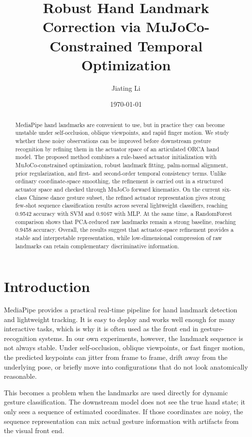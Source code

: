 \documentclass[11pt]{article}
\title{Robust Hand Landmark Correction via MuJoCo-Constrained Temporal Optimization}
\author{Jiating Li}
\date{\today}
\begin{document}
\maketitle

\begin{abstract}
MediaPipe hand landmarks are convenient to use, but in practice they can become unstable under self-occlusion, oblique viewpoints, and rapid finger motion. We study whether these noisy observations can be improved before downstream gesture recognition by refining them in the actuator space of an articulated ORCA hand model. The proposed method combines a rule-based actuator initialization with MuJoCo-constrained optimization, robust landmark fitting, palm-normal alignment, prior regularization, and first- and second-order temporal consistency terms. Unlike ordinary coordinate-space smoothing, the refinement is carried out in a structured actuator space and checked through MuJoCo forward kinematics. On the current six-class Chinese dance gesture subset, the refined actuator representation gives strong few-shot sequence classification results across several lightweight classifiers, reaching 0.9542 accuracy with SVM and 0.9167 with MLP. At the same time, a RandomForest comparison shows that PCA-reduced raw landmarks remain a strong baseline, reaching 0.9458 accuracy. Overall, the results suggest that actuator-space refinement provides a stable and interpretable representation, while low-dimensional compression of raw landmarks can retain complementary discriminative information.
\end{abstract}

\section{Introduction}
MediaPipe provides a practical real-time pipeline for hand landmark detection and lightweight tracking. It is easy to deploy and works well enough for many interactive tasks, which is why it is often used as the front end in gesture-recognition systems. In our own experiments, however, the landmark sequence is not always stable. Under self-occlusion, oblique viewpoints, or fast finger motion, the predicted keypoints can jitter from frame to frame, drift away from the underlying pose, or briefly move into configurations that do not look anatomically reasonable.

This becomes a problem when the landmarks are used directly for dynamic gesture classification. The downstream model does not see the true hand state; it only sees a sequence of estimated coordinates. If those coordinates are noisy, the sequence representation can mix actual gesture information with artifacts from the visual front end.
\end{document}
